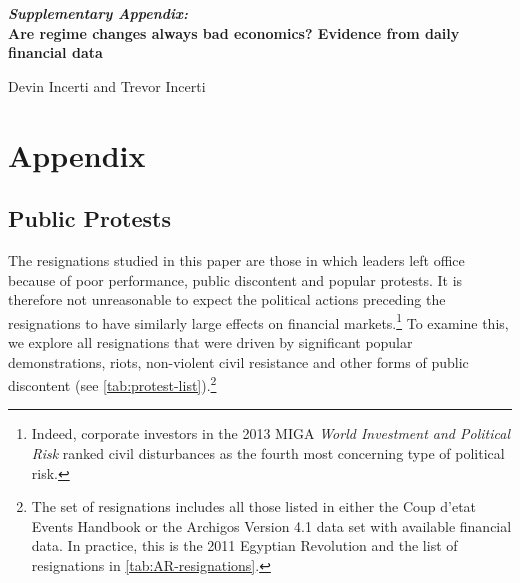 \documentclass[12pt,final,fleqn]{article}
\theoremstyle{plain}
\begin{document}
\newpage





\newpage
\appendix
\setcounter{secnumdepth}{1}
\setcounter{table}{0}
\setcounter{figure}{0}
\renewcommand\thetable{\Alph{section}.\arabic{table}}
\renewcommand\thefigure{\Alph{section}.\arabic{figure}}

\newpage

\begin{centering}
\LARGE
\textbf{\textit{Supplementary Appendix:}} \\
 \vspace{0.5cm}
\textbf{Are regime changes always bad economics? Evidence from daily financial data} \\

\vspace{0.5cm}

\large
Devin Incerti and Trevor Incerti
 
\end{centering}

\section{Appendix} \label{sec: appendix}

\localtableofcontents
{}%
\renewcommand*{\thepage}{A\arabic{page}}

\newpage


\subsection{Public Protests} \label{subsec: Public Protests}

The resignations studied in this paper are those in which leaders left office because of poor performance, public discontent and popular protests. It is therefore not unreasonable to expect the political actions preceding the resignations to have similarly large effects on financial markets.\footnote{Indeed, corporate investors in the 2013 MIGA \textit{World Investment and Political Risk} ranked civil disturbances as the fourth most concerning type of political risk.} To examine this, we explore all resignations that were driven by significant popular demonstrations, riots, non-violent civil resistance and other forms of public discontent (see \autoref{tab:protest-list}).\footnote{The set of resignations includes all those listed in either the Coup d'etat Events Handbook or the Archigos Version 4.1 data set with available financial data. In practice, this is the 2011 Egyptian Revolution and the list of resignations in \autoref{tab:AR-resignations}.}
\end{document}
